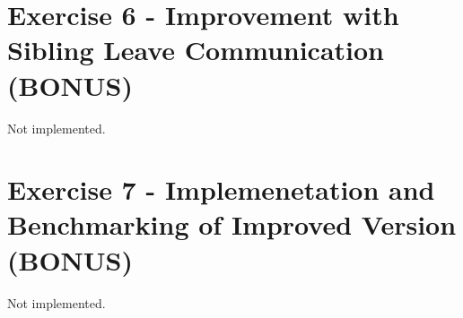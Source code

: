\section{Exercise 6 - Improvement with Sibling Leave Communication (BONUS)}
Not implemented.

\section{Exercise 7 - Implemenetation and Benchmarking of Improved Version (BONUS)}
Not implemented.